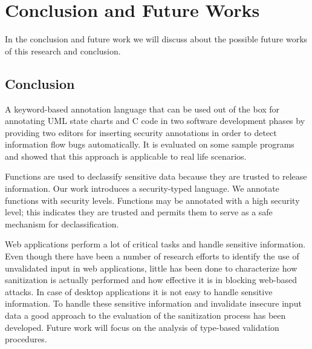 \chapter{Conclusion and Future Works}

In the conclusion and future work we will discuss about the possible future works of this research and conclusion.

\section{Conclusion}
A keyword-based annotation language that can be used out of the box for annotating UML state charts and C code in two software development phases by providing two editors for inserting security annotations in order to detect information flow bugs automatically. It is evaluated on some sample programs and showed that this approach is applicable to real life scenarios.

Functions are used to declassify sensitive data because they are trusted to release information. Our work introduces a security-typed language. We annotate functions with security levels. Functions may be annotated with a high security level; this indicates they are trusted and permits them to serve as a safe mechanism for declassification.

Web applications perform a lot of critical tasks and
handle sensitive information. Even though there have been
a number of research efforts to identify the use of unvalidated input in web applications, little has been done
to characterize how sanitization is actually performed and
how effective it is in blocking web-based attacks. In case of desktop applications it is not easy to handle sensitive information. To handle these sensitive information and invalidate insecure input data a good approach to the evaluation of the sanitization process has been developed. Future work will focus on the analysis of type-based validation procedures.

